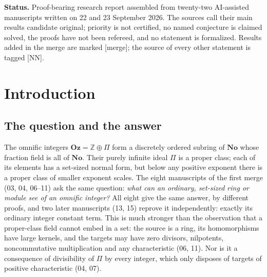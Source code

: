 \documentclass[11pt,letterpaper]{article}
\numberwithin{equation}{section}
\theoremstyle{definition}
\theoremstyle{remark}
\theoremstyle{plain}
\newcommand{\No}{\mathbf{No}}
\newcommand{\Oz}{\mathbf{Oz}}
\newcommand{\Z}{\mathbb Z}
\newcommand{\src}[1]{\textup{\textsf{[#1]}}}
\newcommand{\merge}{\textup{\textsf{[merge]}}}
\begin{document}
\begin{titlepage}
\begin{minipage}{0.9\textwidth}
\begin{abstract}
merge of unrefereed manuscripts; nothing in it is verified in Lean.
\end{abstract}
\end{minipage}
\vfill
\begin{minipage}{0.9\textwidth}\small
\textbf{Status.} Proof-bearing research report assembled from twenty-two AI-assisted
manuscripts written on 22 and 23 September 2026. The sources call their main results candidate
original; priority is not certified, no named conjecture is claimed solved, the proofs have
not been refereed, and no statement is formalized. Results added in the merge are marked
\merge; the source of every other statement is tagged \src{NN}.
\end{minipage}
\end{titlepage}
\hypersetup{pageanchor=true}
\begingroup
\small
\setlength{\parskip}{0pt}
\tableofcontents
\endgroup
\clearpage

\section{Introduction}\label{osq:sec:intro}

\subsection{The question and the answer}\label{osq:sub:question}
The omnific integers $\Oz=\Z\oplus\Pi$ form a discretely ordered subring of $\No$ whose
fraction field is all of $\No$. Their purely infinite ideal $\Pi$ is a proper class; each of
its elements has a set-sized normal form, but below any positive exponent there is a proper
class of smaller exponent scales. The eight manuscripts of the first merge (03, 04, 06--11) ask
the same question: \emph{what can an ordinary, set-sized ring or module see of an omnific
integer?} All eight give the same answer, by different proofs, and two later manuscripts (13, 15)
reprove it independently: exactly its ordinary integer constant term. This
is much stronger than the observation that a proper-class field cannot embed in a set: the
source is a ring, its homomorphisms have large kernels, and the targets may have zero
divisors, nilpotents, noncommutative multiplication and any characteristic (06, 11). Nor is
it a consequence of divisibility of $\Pi$ by every integer, which only disposes of targets
of positive characteristic (04, 07).
\end{document}
